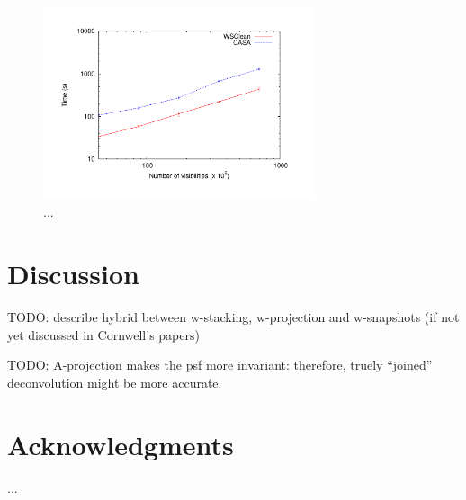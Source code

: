 \documentclass[useAMS,usenatbib]{mn2e}
\DeclareRobustCommand{\TUSSEN}[3]{#2}
\begin{document}
\begin{figure}
\begin{center}
\includegraphics[width=8cm]{img/benchmark-nsamples/nsamples}
\caption{...}
\label{fig:timing-nsamples}
\end{center}
\end{figure}

\section{Discussion} \label{sec:discussion}
TODO: describe hybrid between w-stacking, w-projection and w-snapshots (if not yet discussed in Cornwell's papers)

TODO: A-projection makes the psf more invariant: therefore, truely ``joined'' deconvolution might be more accurate.

\section*{Acknowledgments}
...

\DeclareRobustCommand{\TUSSEN}[3]{#3}




\label{lastpage}
\end{document}
